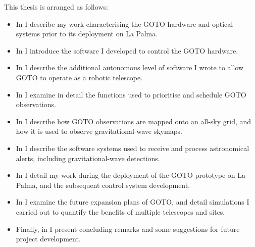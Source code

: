 \begin{colsection}
This thesis is arranged as follows:
%
\begin{itemize}
    \item In  I describe my work characterising the GOTO hardware and optical systems prior to its deployment on La Palma.
    \item In  I introduce the software I developed to control the GOTO hardware.
    \item In  I describe the additional autonomous level of software I wrote to allow GOTO to operate as a robotic telescope.
    \item In  I examine in detail the functions used to prioritise and schedule GOTO observations.
    \item In  I describe how GOTO observations are mapped onto an all-sky grid, and how it is used to observe gravitational-wave skymaps.
    \item In  I describe the software systems used to receive and process astronomical alerts, including gravitational-wave detections.
    \item In  I detail my work during the deployment of the GOTO prototype on La Palma, and the subsequent control system development.
    \item In  I examine the future expansion plans of GOTO, and detail simulations I carried out to quantify the benefits of multiple telescopes and sites.
    \item Finally, in  I present concluding remarks and some suggestions for future project development.
\end{itemize}

\end{colsection}

